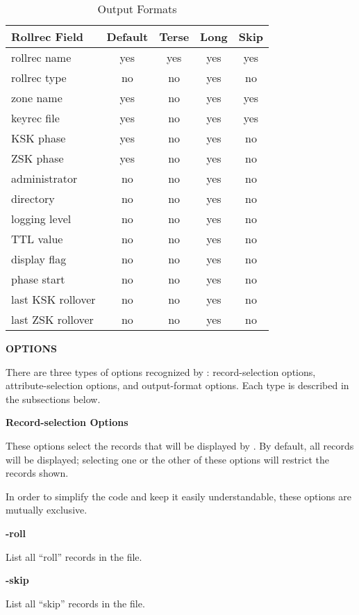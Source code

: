 \begin{table}[ht]
\begin{center}
\begin{tabular}{|l|c|c|c|c|}
\hline
{\bf Rollrec Field} & {\bf Default} & {\bf Terse} & {\bf Long} & {\bf Skip} \\
\hline
rollrec name      & yes & yes & yes & yes \\
rollrec type      & no  & no  & yes & no  \\
zone name         & yes & no  & yes & yes \\
keyrec file       & yes & no  & yes & yes \\
KSK phase         & yes & no  & yes & no  \\
ZSK phase         & yes & no  & yes & no  \\
administrator     & no  & no  & yes & no  \\
directory         & no  & no  & yes & no  \\
logging level     & no  & no  & yes & no  \\
TTL value         & no  & no  & yes & no  \\
display flag      & no  & no  & yes & no  \\
phase start       & no  & no  & yes & no  \\
last KSK rollover & no  & no  & yes & no  \\
last ZSK rollover & no  & no  & yes & no  \\
\hline
\end{tabular}
\end{center}
\caption{ Output Formats}
\end{table}

{\bf OPTIONS}

There are three types of options recognized by :  record-selection
options, attribute-selection options, and output-format options.  Each type
is described in the subsections below.

{\bf Record-selection Options}

These options select the records that will be displayed by .
By default, all records will be displayed; selecting one or the other of
these options will restrict the records shown.

In order to simplify the  code and keep it easily understandable,
these options are mutually exclusive.

\begin{description}

\item {\bf -roll}\verb" "

List all ``roll'' records in the  file.

\item {\bf -skip}\verb" "

List all ``skip'' records in the  file.

\end{description}

